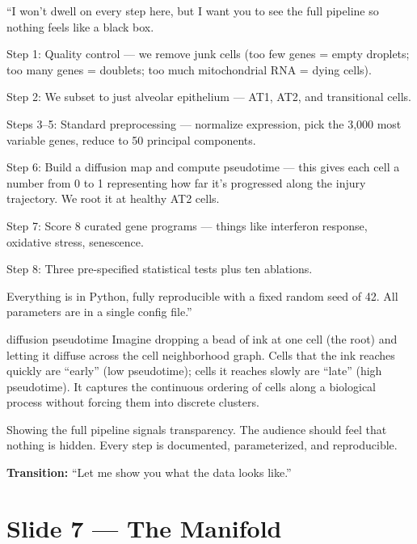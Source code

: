 \documentclass[11pt]{article}
\begin{document}
\begin{speaknote}
``I won't dwell on every step here, but I want you to see the full pipeline so nothing feels like a black box.

Step 1: Quality control --- we remove junk cells (too few genes = empty droplets; too many genes = doublets; too much mitochondrial RNA = dying cells).

Step 2: We subset to just alveolar epithelium --- AT1, AT2, and transitional cells.

Steps 3--5: Standard preprocessing --- normalize expression, pick the 3,000 most variable genes, reduce to 50 principal components.

Step 6: Build a diffusion map and compute pseudotime --- this gives each cell a number from 0 to 1 representing how far it's progressed along the injury trajectory. We root it at healthy AT2 cells.

Step 7: Score 8 curated gene programs --- things like interferon response, oxidative stress, senescence.

Step 8: Three pre-specified statistical tests plus ten ablations.

Everything is in Python, fully reproducible with a fixed random seed of 42. All parameters are in a single config file.''
\end{speaknote}

\begin{jargon}{diffusion pseudotime}
Imagine dropping a bead of ink at one cell (the root) and letting it diffuse across the cell neighborhood graph. Cells that the ink reaches quickly are ``early'' (low pseudotime); cells it reaches slowly are ``late'' (high pseudotime). It captures the continuous ordering of cells along a biological process without forcing them into discrete clusters.
\end{jargon}

\begin{whyblock}
Showing the full pipeline signals transparency. The audience should feel that nothing is hidden. Every step is documented, parameterized, and reproducible.
\end{whyblock}

\textbf{Transition:} ``Let me show you what the data looks like.''


\section{Slide 7 --- The Manifold}
\end{document}
